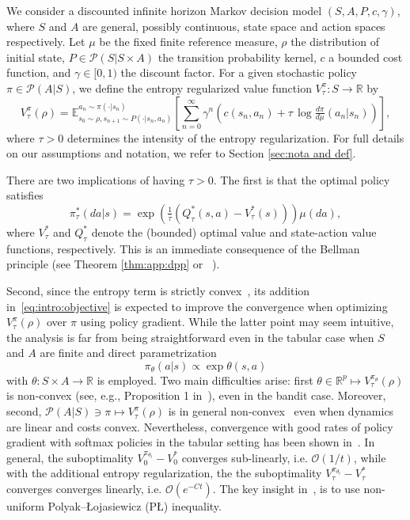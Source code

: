 \documentclass{amsart}
\theoremstyle{definition}
\begin{document}
We consider a discounted infinite horizon Markov decision model $(S,A,P,c,\gamma)$, where $S$ and $A$ are general, possibly continuous, state space and action spaces respectively.
Let $\mu$ be the fixed finite reference measure, $\rho$ the distribution of initial state, $P\in \mathcal{P}(S|S\times A)$ the transition probability kernel, $c$ a bounded cost function, and $\gamma\in [0,1)$ the discount factor.
For a given stochastic policy $\pi \in \mathcal{P}(A|S)$, we define the entropy regularized value function $V^{\pi}_{\tau}:S\rightarrow \mathbb{R}$  by
\begin{equation}\label{eq:intro:objective}
V^{\pi}_{\tau}(\rho)= \mathbb{E}_{s_0 \sim \rho,s_{n+1}\sim P(\cdot|s_n,a_n)}^{a_n\sim \pi(\cdot|s_n)}\left[\sum_{n=0}^{\infty}\gamma^{n} \left(c(s_n,a_n)+\tau\,\log\tfrac{d\pi}{d\mu}(a_n|s_n)\right)\right],
\end{equation}
where $\tau > 0$ determines the intensity of the entropy regularization.
For full details on our assumptions and notation, we refer to Section \ref{sec:nota and def}.

There are two implications of having $\tau>0$.
The first is that the optimal policy satisfies
\begin{equation}\label
{eq:intro:optimal_policy}
\pi_\tau^*(d a|s)=\exp \left(\tfrac{1}{\tau}\left(Q_\tau^*(s, a)-V_\tau^*(s)\right)\right) \mu(d a),
\end{equation}
where $V_\tau^*$ and $Q_\tau^*$ denote the (bounded) optimal value and state-action value functions, respectively. This is an immediate consequence of the Bellman principle (see Theorem \ref{thm:app:dpp} or ~\cite{ziebart2010modeling, haarnoja2017reinforcement, geist2019theory}). 

Second, since the entropy term is strictly convex~\cite[Section 1.4]{dupuis2011weak}, its addition in~\eqref{eq:intro:objective} is expected to improve the convergence when optimizing $V_\tau^\pi(\rho)$ over $\pi$ using policy gradient.
While the latter point may seem intuitive, the analysis is far from being straightforward even in the tabular case when $S$ and $A$ are finite and
direct parametrization 
\begin{equation}\label{eq:softmax}  
\pi_\theta(a|s)\propto \exp \theta(s,a)
\end{equation}
with $\theta: S\times A\rightarrow \mathbb{R}$ is employed.
Two main difficulties arise: first $\theta \in \mathbb{R}^p \mapsto V^{\pi_\theta}_\tau(\rho)$ is non-convex (see, e.g., Proposition 1 in~\cite{mei2020global}), even in the bandit case. 
Moreover, second, $\mathcal P(A|S) \ni \pi \mapsto V_\tau^\pi(\rho)$ is in general non-convex~\cite{agarwal2021theory, Giegrich2024} even when dynamics are linear and costs convex.
Nevertheless, convergence with good rates of policy gradient with softmax policies in the tabular setting has been shown in~\cite{mei2020global}.
In general, the suboptimality $V^{\pi_{\theta_t}}_0 - V^\ast_0$ converges sub-linearly, i.e. $\mathcal O(1/t)$, while with the additional entropy regularization, the the suboptimality $V^{\pi_{\theta_t}}_\tau - V^\ast_\tau$ converges converges linearly, i.e. $\mathcal O(e^{-Ct})$.
The key insight in~\cite{mei2020global}, is to use non-uniform Polyak--\L ojasiewicz (P\L) inequality.
\end{document}
